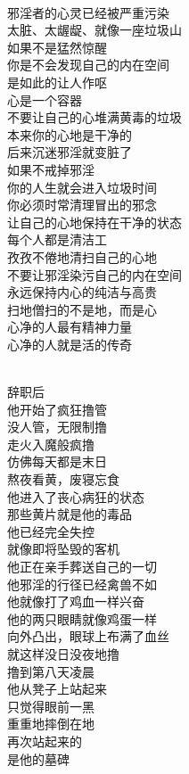 \begin{poem}[清理内在空间]
    \begin{multicols}{2}
        \centering~\\
        邪淫者的心灵已经被严重污染 \\ 太脏、太龌龊、就像一座垃圾山 \\ 如果不是猛然惊醒 \\ 你是不会发现自己的内在空间 \\ 是如此的让人作呕 \\ 心是一个容器 \\ 不要让自己的心堆满黄毒的垃圾 \\ 本来你的心地是干净的 \\ 后来沉迷邪淫就变脏了 \\ 如果不戒掉邪淫 \\ 你的人生就会进入垃圾时间 \\ 你必须时常清理冒出的邪念 \\ 让自己的心地保持在干净的状态 \\ 每个人都是清洁工 \\ 孜孜不倦地清扫自己的心地 \\ 不要让邪淫染污自己的内在空间 \\ 永远保持内心的纯洁与高贵 \\ 扫地僧扫的不是地，而是心 \\ 心净的人最有精神力量 \\ 心净的人就是活的传奇
    \end{multicols}
\end{poem}

\begin{poem}[疯撸的第八天]
    \begin{multicols}{3}
        \centering~\\
        辞职后 \\ 他开始了疯狂撸管 \\ 没人管，无限制撸 \\ 走火入魔般疯撸 \\ 仿佛每天都是末日 \\ 熬夜看黄，废寝忘食 \\ 他进入了丧心病狂的状态 \\ 那些黄片就是他的毒品 \\ 他已经完全失控 \\ 就像即将坠毁的客机 \\ 他正在亲手葬送自己的一切 \\ 他邪淫的行径已经禽兽不如 \\ 他就像打了鸡血一样兴奋 \\ 他的两只眼睛就像鸡蛋一样 \\ 向外凸出，眼球上布满了血丝 \\ 就这样没日没夜地撸 \\ 撸到第八天凌晨 \\ 他从凳子上站起来 \\ 只觉得眼前一黑 \\ 重重地摔倒在地 \\ 再次站起来的 \\ 是他的墓碑
    \end{multicols}
\end{poem}

